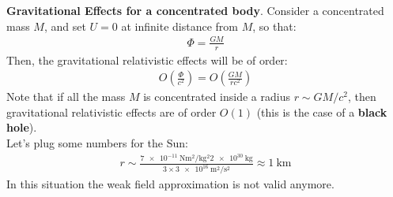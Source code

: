 \documentclass[../template.tex]{subfiles}
\begin{document}
\textbf{Gravitational Effects for a concentrated body}. Consider a concentrated mass $M$, and set $U=0$ at infinite distance from $M$, so that:
\begin{align*}
    \Phi = \frac{GM}{r} 
\end{align*}   
Then, the gravitational relativistic effects will be of order:
\begin{align*}
    O\left(\frac{\Phi}{c^2} \right) = O\left(\frac{GM}{r c^2} \right)
\end{align*}
Note that if all the mass $M$ is concentrated inside a radius $r \sim GM/c^2$, then gravitational relativistic effects are of order $O(1)$ (this is the case of a \textbf{black hole}).\\
Let's plug some numbers for the Sun:
\begin{align*}
    r \sim \frac{\SI{7e-11}{\newton\m\squared\per\kilo\g\squared} \SI{2e30}{\kilo\g}}{3\times\SI{3e16}{\m\squared\per\s\squared}} \approx \SI{1}{\kilo\m} 
\end{align*}  
In this situation the weak field approximation is not valid anymore.
\end{document}
